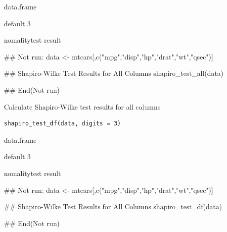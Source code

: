 \documentclass[a4paper]{book}
\begin{document}
%
\begin{Arguments}
\begin{ldescription}
\item[\code{data}] data.frame

\item[\code{digits}] default 3
\end{ldescription}
\end{Arguments}
%
\begin{Value}
nomalitytest result
\end{Value}
%
\begin{Examples}
\begin{ExampleCode}
## Not run: 
data <- mtcars[,c("mpg","disp","hp","drat","wt","qsec")]

## Shapiro-Wilke Test Results for All Columns
shapiro_test_all(data)


## End(Not run)

\end{ExampleCode}
\end{Examples}
%
\begin{Description}
Calculate Shapiro-Wilke test results for all columns
\end{Description}
%
\begin{Usage}
\begin{verbatim}
shapiro_test_df(data, digits = 3)
\end{verbatim}
\end{Usage}
%
\begin{Arguments}
\begin{ldescription}
\item[\code{data}] data.frame

\item[\code{digits}] default 3
\end{ldescription}
\end{Arguments}
%
\begin{Value}
nomalitytest result
\end{Value}
%
\begin{Examples}
\begin{ExampleCode}
## Not run: 
data <- mtcars[,c("mpg","disp","hp","drat","wt","qsec")]

## Shapiro-Wilke Test Results for All Columns
shapiro_test_df(data)


## End(Not run)
\end{ExampleCode}
\end{Examples}
\end{document}
